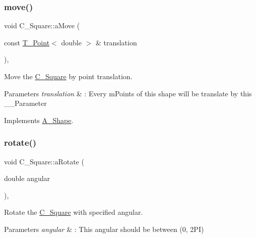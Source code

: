 \mbox{\label{classSquare_a75b2fd22fc3895b83bc20728afb20b10}} 
\subsubsection{\texorpdfstring{move()}{move()}}
{\footnotesize\ttfamily void C_Square\+::aMove (\begin{DoxyParamCaption}\item[{const \hyperlink{classPoint}{T_Point}$<$ double $>$ \&}]{translation }\end{DoxyParamCaption})\hspace{0.3cm}{\ttfamily [override]}, {\ttfamily [virtual]}}



Move the \hyperlink{classSquare}{C_Square} by point translation.


\begin{DoxyParams}{Parameters}
{\em translation} & \+: Every mPoints of this shape will be translate by this __Parameter \\
\hline
\end{DoxyParams}


Implements \hyperlink{classShape_a1f447acd6219cb10b9b7a40371519c46}{A_Shape}.

\mbox{\label{classSquare_a5714e182c30f996b78e74e1badd054a2}} 
\subsubsection{\texorpdfstring{rotate()}{Rotate()}}
{\footnotesize\ttfamily void C_Square\+::aRotate (\begin{DoxyParamCaption}\item[{double}]{angular }\end{DoxyParamCaption})\hspace{0.3cm}{\ttfamily [override]}, {\ttfamily [virtual]}}



Rotate the \hyperlink{classSquare}{C_Square} with specified angular.


\begin{DoxyParams}{Parameters}
{\em angular} & \+: This angular should be between (0, 2\+PI) \\
\hline
\end{DoxyParams}


